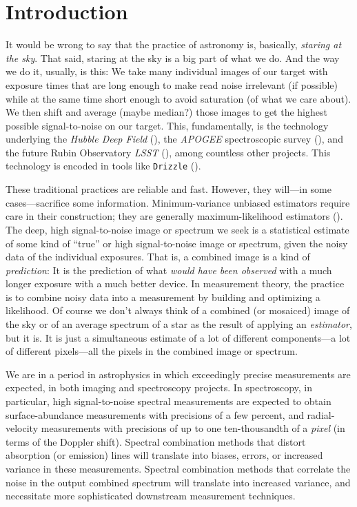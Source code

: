\documentclass[modern, linenumbers]{aastex631}
\begin{document}
\section{Introduction}\label{sec:intro}

It would be wrong to say that the practice of astronomy is, basically, \emph{staring at the sky}.
That said, staring at the sky is a big part of what we do.
And the way we do it, usually, is this:
We take many individual images of our target with exposure times that are long enough to make read noise irrelevant (if possible) while at the same time short enough to avoid saturation (of what we care about).
We then shift and average (maybe median?) those images to get the highest possible signal-to-noise on our target.
This, fundamentally, is the technology underlying the \textsl{Hubble Deep Field} (\citealt{hdf}),
the \textsl{APOGEE} spectroscopic survey (\citealt{apogee}),
and the future Rubin Observatory \textsl{LSST} (\citealt{lsst}), among countless other projects.
This technology is encoded in tools like \texttt{Drizzle} (\citealt{drizzle}).

These traditional practices are reliable and fast.
However, they will---in some cases---sacrifice some information.
Minimum-variance unbiased estimators require care in their construction; they are generally maximum-likelihood estimators (\citealt{mvue}).
The deep, high signal-to-noise image or spectrum we seek is a statistical estimate of some kind of ``true'' or high signal-to-noise image or spectrum, given the noisy data of the individual exposures.
That is, a combined image is a kind of \emph{prediction}: It is the prediction of what \emph{would have been observed} with a much longer exposure with a much better device.
In measurement theory, the practice is to combine noisy data into a measurement by building and optimizing a likelihood.
Of course we don't always think of a combined (or mosaiced) image of the sky or of an average spectrum of a star as the result of applying an \emph{estimator}, but it is.
It is just a simultaneous estimate of a lot of different components---a lot of different pixels---all the pixels in the combined image or spectrum.

We are in a period in astrophysics in which exceedingly precise measurements are expected, in both imaging and spectroscopy projects.
In spectroscopy, in particular, high signal-to-noise spectral measurements are expected to obtain surface-abundance measurements with precisions of a few percent, and radial-velocity measurements with precisions of up to one ten-thousandth of a \emph{pixel} (in terms of the Doppler shift).
Spectral combination methods that distort absorption (or emission) lines will translate into biases, errors, or increased variance in these measurements.
Spectral combination methods that correlate the noise in the output combined spectrum will translate into increased variance, and necessitate more sophisticated downstream measurement techniques.
\end{document}
